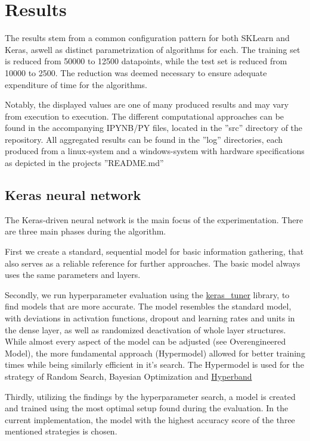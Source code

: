 \chapter{Results}
The results stem from a common configuration pattern for both SKLearn and Keras, aswell as distinct parametrization of algorithms for each.
The training set is reduced from 50000 to 12500 datapoints, while the test set is reduced from 10000 to 2500. The reduction was deemed necessary to ensure
adequate expenditure of time for the algorithms. 

Notably, the displayed values are one of many produced results and may vary from execution to execution.
The different computational approaches can be found in the accompanying IPYNB/PY files, located in the ''src'' directory of the repository.
All aggregated results can be found in the ''log'' directories, each produced from a linux-system and a windows-system with hardware specifications as depicted
in the projects ''README.md''

\section{Keras neural network}
The Keras-driven neural network is the main focus of the experimentation. There are three main phases during the algorithm.

First we create a standard, sequential model for basic information gathering, that also serves as a 
reliable reference for further approaches. The basic model always uses the same parameters and layers.

Secondly, we run hyperparameter evaluation using the \href{https://keras.io/keras_tuner/}{keras\_tuner} library, to find models that are 
more accurate. The model resembles the standard model, with deviations in activation functions, dropout and learning rates and units in the dense layer, as well as randomized deactivation of whole layer structures.
While almost every aspect of the model can be adjusted (see Overengineered Model), the more fundamental approach (Hypermodel) allowed for better training times while being similarly efficient in it's search.
The Hypermodel is used for the strategy of Random Search, Bayesian Optimization and \href{https://arxiv.org/abs/1603.06560}{Hyperband}

Thirdly, utilizing the findings by the hyperparameter search, a model is created and trained using the most optimal setup found during the evaluation.
In the current implementation, the model with the highest accuracy score of the three mentioned strategies is chosen.

